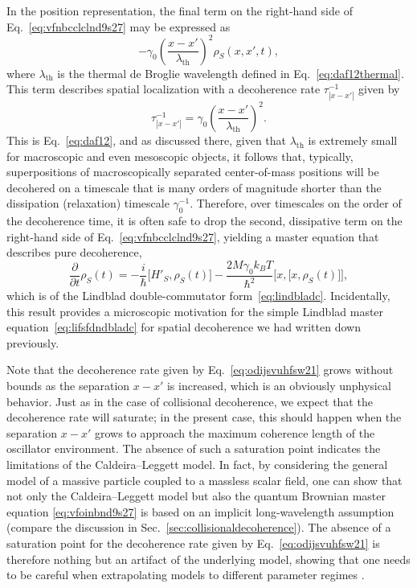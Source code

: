 \documentclass[3p,sort&compress]{elsarticle}
\providecommand{\abs}[1]{\left\lvert#1\right\rvert}
\newcommand{\I}{\ensuremath{i}}
\newcommand{\op}[1]{#1}
\begin{document}
In the position representation, the final term on the right-hand side of Eq.~\eqref{eq:vfnbcclclnd9s27} may be expressed as
%
\begin{equation}
  \label{eq:fsdojgdj1}
  -  \gamma_0 \left( \frac{x-x'}{\lambda_\text{th}} \right)^2 \rho_S(x,x',t),
\end{equation}
%
where $\lambda_\text{th}$ is the thermal de Broglie wavelength  defined in Eq.~\eqref{eq:daf12thermal}. This term describes spatial localization with a decoherence rate $\tau_{\abs{x-x'}}^{-1}$ given by \cite{Zurek:1986:uz}
%
\begin{equation}
\label{eq:odijsvuhfsw21}
  \tau_{\abs{x-x'}}^{-1} = \gamma_0 \left(
    \frac{x-x'}{\lambda_\text{th}} \right)^2.
\end{equation}
%
This is Eq.~\eqref{eq:daf12}, and as discussed there, given that $\lambda_\text{th}$ is extremely small for macroscopic and even mesoscopic objects, it follows that, typically, superpositions of macroscopically separated center-of-mass positions will be decohered on a timescale that is many orders of magnitude shorter than the dissipation (relaxation) timescale $\gamma^{-1}_0$. Therefore, over timescales on the order of the decoherence time, it is often safe to drop the second, dissipative term on the right-hand side of Eq.~\eqref{eq:vfnbcclclnd9s27}, yielding a master equation that describes pure decoherence,
%
\begin{equation}
\label{eq:vfnbcclasclnd9s27}
  \frac{\partial}{\partial t} \op{\rho}_S(t)  = -\frac{\I}{\hbar} \bigl[
  \op{H}'_S, \op{\rho}_S(t) \bigr] 
 - \frac{2 M\gamma_0 k_B T}{\hbar^2} \bigl[ x, \bigl[ x, \op{\rho}_S(t) \bigr]
\bigr],
\end{equation}
%
which is of the Lindblad double-commutator form~\eqref{eq:lindbladc}. Incidentally, this result provides a microscopic motivation for the simple Lindblad master equation~\eqref{eq:lifsfdndbladc} for spatial decoherence we had written down previously. 

Note that the decoherence rate given by Eq.~\eqref{eq:odijsvuhfsw21} grows without bounds as the separation $x-x'$ is increased, which is an obviously unphysical behavior. Just as in the case of collisional decoherence, we expect that the decoherence rate will saturate; in the present case, this should happen when the separation $x-x'$ grows to approach the maximum coherence length of the oscillator environment. The absence of such a saturation point indicates the limitations of the Caldeira--Leggett model. In fact, by considering the general model of a massive particle coupled to a massless scalar field, one can show \cite{Unruh:1989:rc,Anglin:1997:za,Paz:2001:aa} that not only the Caldeira--Leggett model but also the quantum Brownian master equation \eqref{eq:vfoinbnd9s27} is based on an implicit long-wavelength assumption (compare the discussion in Sec.~\ref{sec:collisionaldecoherence}). The absence of a saturation point for the decoherence rate given by Eq.~\eqref{eq:odijsvuhfsw21} is therefore nothing but an artifact of the underlying model, showing that one needs to be careful when extrapolating models to different parameter regimes \cite{Gallis:1990:un,Gallis:1992:im,Anglin:1997:za}. 
\end{document}
